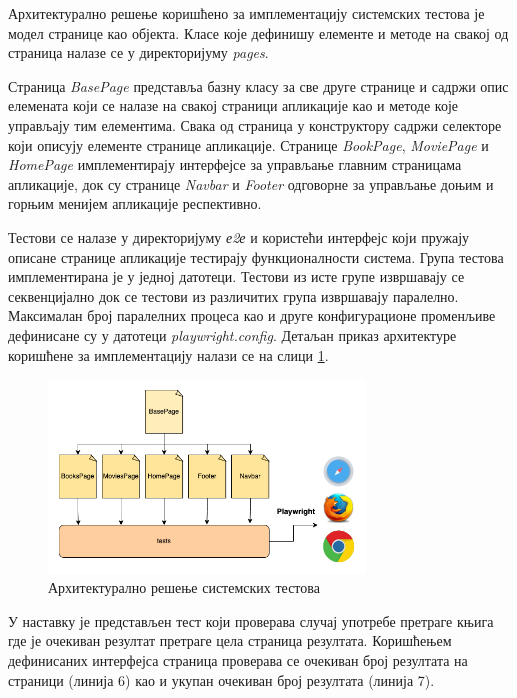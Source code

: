 \documentclass[12pt,oneside]{memoir}
\begin{document}
Архитектурално решење коришћено за имплементацију системских тестова  је модел странице као објекта. Класе које дефинишу елементе и методе на свакој од страница налазе се у директоријуму \textit{pages}. 

Страница \textit{BasePage} представља базну класу за све друге странице и садржи опис елемената који се налазе на свакој страници апликације као и методе које управљају тим елементима.  Свака од страница у конструктору садржи селекторе који описују елементе странице апликације. Странице \textit{BookPage}, \textit{MoviePage} и \textit{HomePage} имплементирају интерфејсе за управљање главним страницама апликације, док су странице \textit{Navbar} и \textit{Footer} одговорне за управљање доњим и горњим менијем апликације респективно.

Тестови се налазе у директоријуму \textit{е2е} и користећи интерфејс који пружају описане странице апликације тестирају функционалности система. Група тестова имплементирана је у једној датотеци. Тестови из исте групе извршавају се секвенцијално док се тестови из различитих група извршавају паралелно. Максималан број паралелних процеса као и друге конфигурационе променљиве дефинисане су у датотеци \textit{playwright.config}. Детаљан приказ архитектуре коришћене за имплементацију налази се на слици \ref{fig:arhitektura}.

\begin{figure}[!ht]
  \centering
  \includegraphics[width=0.75\textwidth]{matfmaster/img/arhitektura.png}
  \caption{Архитектурално решење системских тестова}
  \label{fig:arhitektura}
\end{figure}

У наставку је представљен тест који проверава случај употребе претраге књига где је очекиван резултат претраге цела страница резултата. Коришћењем дефинисаних интерфејса страница проверава се очекиван број резултата на страници (линија 6) као и укупан очекиван број резултата (линија 7).
\end{document}
